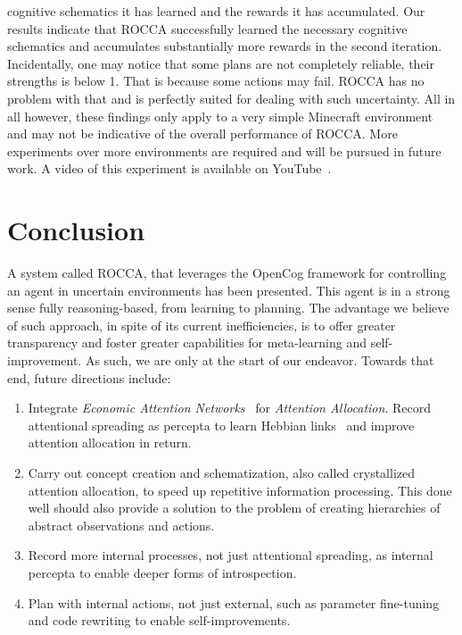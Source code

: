 \documentclass[runningheads]{llncs}
\begin{document}
cognitive schematics it has learned and the rewards it has
accumulated. Our results indicate that ROCCA successfully learned the
necessary cognitive schematics and accumulates substantially more
rewards in the second iteration.  Incidentally, one may notice that
some plans are not completely reliable, their strengths is below 1.
That is because some actions may fail.  ROCCA has no problem with that
and is perfectly suited for dealing with such uncertainty.  All in all
however, these findings only apply to a very simple Minecraft
environment
and may not be indicative of the overall performance of ROCCA.  More
experiments over more environments are required
and will be pursued in future work.  A video of this experiment is
available on YouTube~\cite{ROCCADemo}.

\section{Conclusion}
\label{sec:conclusion}
A system called ROCCA, that leverages the OpenCog framework for
controlling an agent in uncertain environments has been presented.
This agent is in a strong sense fully reasoning-based, from learning
to planning.  The advantage we believe of such approach, in spite of
its current inefficiencies, is to offer greater transparency and
foster greater capabilities for meta-learning and self-improvement.
As such, we are only at the start of our endeavor.  Towards that end,
future directions include:
\begin{enumerate}
\item Integrate \emph{Economic Attention Networks}~\cite{Pitt2009} for
  \emph{Attention Allocation}.  Record attentional spreading as
  percepta to learn Hebbian links~\cite{Pitt2009} and improve
  attention allocation in return.
\item Carry out concept creation and schematization, also called
  crystallized attention allocation, to speed up repetitive
  information processing.  This done well should also provide a
  solution to the problem of creating hierarchies of abstract
  observations and actions.
\item Record more internal processes, not just attentional spreading, as
  internal percepta to enable deeper forms of introspection.
\item Plan with internal actions, not just external, such as parameter
  fine-tuning and code rewriting to enable self-improvements.
\end{enumerate}
\end{document}
